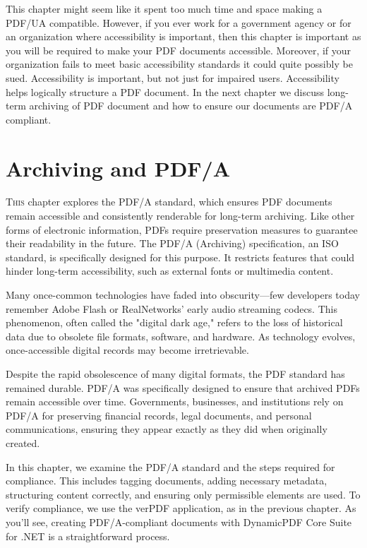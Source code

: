 \documentclass[american]{tufte-book}
\numberwithin{equation}{section}
\numberwithin{figure}{section}
\def\color#1{}%
\begin{document}
{{This chapter might seem like it spent too much time and space making
a PDF/UA compatible. However, if you ever work for a government agency
or for an organization where accessibility is important, then this
chapter is important as you will be required to make your PDF documents
accessible. Moreover, if your organization fails to meet basic accessibility
standards it could quite possibly be sued. Accessibility is important,
but not just for impaired users. Accessibility helps logically structure
a PDF document. In the next chapter we discuss long-term archiving
of PDF document and how to ensure our documents are PDF/A compliant.

\color{white}
\chapter{Archiving and PDF/A}\label{chap:Archiving-and-PDF/A}
\color{black}
\BgThispage
\vspace{8.0em}
\lettrine[lines=2,lhang=0.1]{T}{his} chapter explores the PDF/A standard, which ensures PDF documents remain accessible and consistently renderable for long-term archiving. Like other forms of electronic information, PDFs require preservation measures to guarantee their readability in the future. The PDF/A (Archiving) specification, an ISO standard, is specifically designed for this purpose. It restricts features that could hinder long-term accessibility, such as external fonts or multimedia content.

Many once-common technologies have faded into obscurity—few developers today remember Adobe Flash or RealNetworks’ early audio streaming codecs. This phenomenon, often called the "digital dark age," refers to the loss of historical data due to obsolete file formats, software, and hardware. As technology evolves, once-accessible digital records may become irretrievable.

Despite the rapid obsolescence of many digital formats, the PDF standard has remained durable. PDF/A was specifically designed to ensure that archived PDFs remain accessible over time. Governments, businesses, and institutions rely on PDF/A for preserving financial records, legal documents, and personal communications, ensuring they appear exactly as they did when originally created.

In this chapter, we examine the PDF/A standard and the steps required for compliance. This includes tagging documents, adding necessary metadata, structuring content correctly, and ensuring only permissible elements are used. To verify compliance, we use the verPDF application, as in the previous chapter. As you'll see, creating PDF/A-compliant documents with DynamicPDF Core Suite for .NET is a straightforward process.
}}
\end{document}
